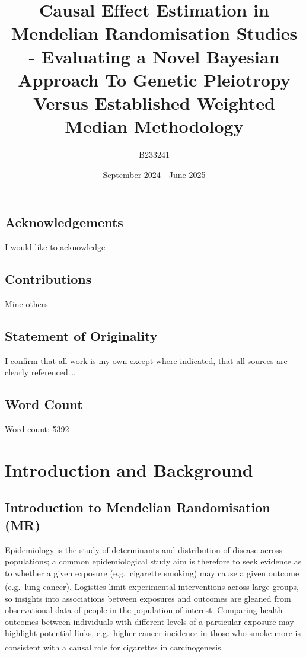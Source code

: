 \documentclass[
]{article}
\title{Causal Effect Estimation in Mendelian Randomisation Studies - Evaluating a Novel Bayesian Approach To Genetic Pleiotropy Versus Established Weighted Median Methodology}
\author{B233241}
\date{September 2024 - June 2025}
\begin{document}
\maketitle

{
\hypersetup{linkcolor=}
\setcounter{tocdepth}{2}
\tableofcontents
}
\newpage

\subsection*{Acknowledgements}\label{acknowledgements}

I would like to acknowledge

\subsection*{Contributions}\label{contributions}

Mine others

\subsection*{Statement of Originality}\label{statement-of-originality}

I confirm that all work is my own except where indicated, that all sources are clearly referenced\ldots.

\subsection*{Word Count}\label{word-count}

Word count:
5392

\newpage

\section{Introduction and Background}\label{introduction-and-background}

\subsection{Introduction to Mendelian Randomisation (MR)}\label{introduction-to-mendelian-randomisation-mr}

Epidemiology is the study of determinants and distribution of disease across populations; a common epidemiological study aim is therefore to seek evidence as to whether a given exposure (e.g.~cigarette smoking) may cause a given outcome (e.g.~lung cancer)\textsuperscript{}. Logistics limit experimental interventions across large groups, so insights into associations between exposures and outcomes are gleaned from observational data of people in the population of interest. Comparing health outcomes between individuals with different levels of a particular exposure may highlight potential links, e.g.~higher cancer incidence in those who smoke more is consistent with a causal role for cigarettes in carcinogenesis\textsuperscript{}.
\end{document}
